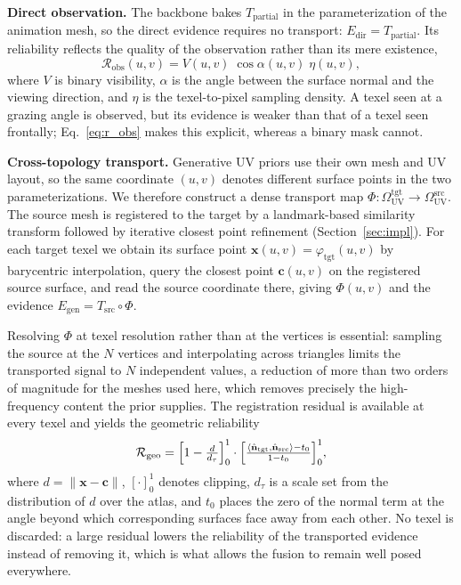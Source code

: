 \documentclass[runningheads]{llncs}
\newcommand{\OUV}{\Omega_{\text{UV}}}
\newcommand{\Tpartial}{T_{\text{partial}}}
\newcommand{\Rel}{\mathcal{R}}
\begin{document}
\textbf{Direct observation.} The backbone bakes $\Tpartial$ in the
parameterization of the animation mesh, so the direct evidence requires no
transport: $E_{\text{dir}} = \Tpartial$. Its reliability reflects the quality
of the observation rather than its mere existence,
\begin{equation}
  \Rel_{\text{obs}}(u,v) = V(u,v)\;\cos\alpha(u,v)\;\eta(u,v),
  \label{eq:r_obs}
\end{equation}
where $V$ is binary visibility, $\alpha$ is the angle between the surface
normal and the viewing direction, and $\eta$ is the texel-to-pixel sampling
density. A texel seen at a grazing angle is observed, but its evidence is
weaker than that of a texel seen frontally; Eq.~\eqref{eq:r_obs} makes this
explicit, whereas a binary mask cannot.

\textbf{Cross-topology transport.} Generative UV priors use their own mesh and
UV layout, so the same coordinate $(u,v)$ denotes different surface points in
the two parameterizations. We therefore construct a dense transport map
$\Phi\colon \OUV^{\text{tgt}} \to \OUV^{\text{src}}$. The source mesh is
registered to the target by a landmark-based similarity transform followed by
iterative closest point refinement \cite{besl1992icp}
(Section~\ref{sec:impl}). For each target texel we obtain its surface point
$\mathbf{x}(u,v) = \varphi_{\text{tgt}}(u,v)$ by barycentric interpolation,
query the closest point $\mathbf{c}(u,v)$ on the registered source surface, and
read the source coordinate there, giving $\Phi(u,v)$ and the evidence
$E_{\text{gen}} = T_{\text{src}} \circ \Phi$.

Resolving $\Phi$ at texel resolution rather than at the vertices is essential:
sampling the source at the $N$ vertices and interpolating across triangles
limits the transported signal to $N$ independent values, a reduction of more
than two orders of magnitude for the meshes used here, which removes precisely
the high-frequency content the prior supplies. The registration residual is
available at every texel and yields the geometric reliability
\begin{equation}
  \Rel_{\text{geo}} =
    \Bigl[1 - \tfrac{d}{d_\tau}\Bigr]_0^1 \cdot
    \Bigl[\tfrac{\langle \hat{\mathbf{n}}_{\text{tgt}},
      \hat{\mathbf{n}}_{\text{src}}\rangle - t_0}{1 - t_0}\Bigr]_0^1,
  \label{eq:r_geo}
\end{equation}
where $d = \|\mathbf{x} - \mathbf{c}\|$, $[\cdot]_0^1$ denotes clipping,
$d_\tau$ is a scale set from the distribution of $d$ over the atlas, and $t_0$
places the zero of the normal term at the angle beyond which corresponding
surfaces face away from each other. No texel is discarded: a large residual
lowers the reliability of the transported evidence instead of removing it,
which is what allows the fusion to remain well posed everywhere.
\end{document}
